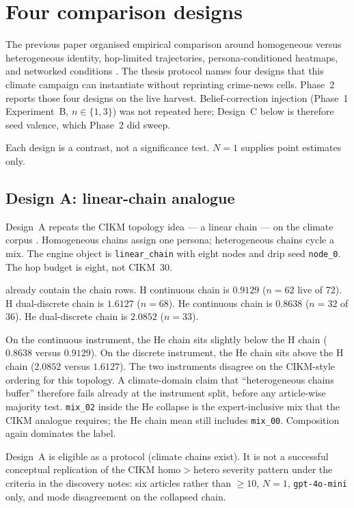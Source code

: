 \section{Four comparison designs}
\label{sec:designs}

The previous paper organised empirical comparison around homogeneous versus heterogeneous identity, hop-limited trajectories, persona-conditioned heatmaps, and networked conditions \parencite{maurya2025simulating}.
The thesis protocol names four designs that this climate campaign can instantiate without reprinting crime-news cells.
Phase~2 reports those four designs on the live harvest.
Belief-correction injection (Phase~1 Experiment~B, $n\in\{1,3\}$) was not repeated here; Design~C below is therefore seed valence, which Phase~2 did sweep.

Each design is a contrast, not a significance test.
$N=1$ supplies point estimates only.

\subsection{Design A: linear-chain analogue}

Design~A repeats the CIKM topology idea --- a linear chain --- on the climate corpus \parencite{maurya2025simulating}.
Homogeneous chains assign one persona; heterogeneous chains cycle a mix.
The engine object is \texttt{linear\_chain} with eight nodes and drip seed \texttt{node\_0}.
The hop budget is eight, not CIKM~30.

 already contain the chain rows.
H continuous chain \MPR{} is $0.9129$ ($n=62$ live of 72).
H dual-discrete chain \MPR{} is $1.6127$ ($n=68$).
He continuous chain \MPR{} is $0.8638$ ($n=32$ of 36).
He dual-discrete chain \MPR{} is $2.0852$ ($n=33$).

On the continuous instrument, the He chain sits slightly below the H chain ($0.8638$ versus $0.9129$).
On the discrete instrument, the He chain sits above the H chain ($2.0852$ versus $1.6127$).
The two instruments disagree on the CIKM-style ordering for this topology.
A climate-domain claim that \enquote{heterogeneous chains buffer} therefore fails already at the instrument split, before any article-wise majority test.
\texttt{mix\_02} inside the He collapse is the expert-inclusive mix that the CIKM analogue requires; the He chain mean still includes \texttt{mix\_00}.
Composition again dominates the label.

Design~A is eligible as a protocol (climate chains exist).
It is not a successful conceptual replication of the CIKM homo$>$hetero severity pattern under the criteria in the discovery notes: six articles rather than $\ge 10$, $N=1$, \texttt{gpt-4o-mini} only, and mode disagreement on the collapsed chain.

